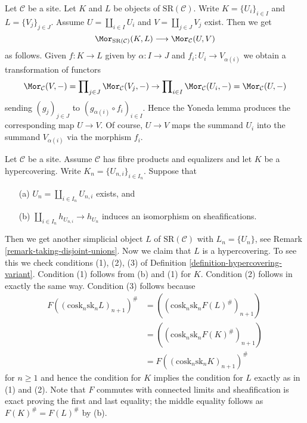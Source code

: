 \begin{remark}
\label{remark-taking-disjoint-unions}
Let $\mathcal{C}$ be a site. Let
$K$ and $L$ be objects of $\text{SR}(\mathcal{C})$.
Write $K = \{U_i\}_{i \in I}$ and $L = \{V_j\}_{j \in J}$.
Assume $U = \coprod_{i \in I} U_i$ and $V = \coprod_{j \in J} V_j$
exist. Then we get
$$
\Mor_{\text{SR}(\mathcal{C})}(K, L) \longrightarrow \Mor_\mathcal{C}(U, V)
$$
as follows. Given $f : K \to L$ given by $\alpha : I \to J$
and $f_i : U_i \to V_{\alpha(i)}$ we obtain a transformation of functors
$$
\Mor_\mathcal{C}(V, -) =
\prod\nolimits_{j \in J} \Mor_\mathcal{C}(V_j, -)
\to
\prod\nolimits_{i \in I} \Mor_\mathcal{C}(U_i, -) =
\Mor_\mathcal{C}(U, -)
$$
sending $(g_j)_{j \in J}$ to
$(g_{\alpha(i)} \circ f_i)_{i \in I}$. Hence the Yoneda lemma
produces the corresponding map $U \to V$. Of course, $U \to V$
maps the summand $U_i$ into the summand $V_{\alpha(i)}$ via
the morphism $f_i$.
\end{remark}

\begin{remark}
\label{remark-take-unions-hypercovering}
Let $\mathcal{C}$ be a site. Assume $\mathcal{C}$ has
fibre products and equalizers and let $K$ be a hypercovering.
Write $K_n = \{U_{n, i}\}_{i \in I_n}$. Suppose that
\begin{enumerate}
\item[(a)] $U_n = \coprod_{i \in I_n} U_{n, i}$ exists, and
\item[(b)] $\coprod_{i \in I_n} h_{U_{n, i}} \to h_{U_n}$ induces
an isomorphism on sheafifications.
\end{enumerate}
Then we get another simplicial object $L$ of $\text{SR}(\mathcal{C})$
with $L_n = \{U_n\}$, see
Remark \ref{remark-taking-disjoint-unions}.
Now we claim that $L$ is a hypercovering.
To see this we check conditions (1), (2), (3) of
Definition \ref{definition-hypercovering-variant}.
Condition (1) follows from (b) and (1) for $K$.
Condition (2) follows in exactly the same way.
Condition (3) follows because
\begin{align*}
F((\text{cosk}_n \text{sk}_n L)_{n + 1})^\#
& =
((\text{cosk}_n \text{sk}_n F(L)^\#)_{n + 1}) \\
& =
((\text{cosk}_n \text{sk}_n F(K)^\#)_{n + 1}) \\
& =
F((\text{cosk}_n \text{sk}_n K)_{n + 1})^\#
\end{align*}
for $n \geq 1$ and hence the condition for $K$ implies the condition for
$L$ exactly as in (1) and (2).
Note that $F$ commutes with connected limits and sheafification is exact
proving the first and last equality; the middle equality follows as
$F(K)^\# = F(L)^\#$ by (b).
\end{remark}

